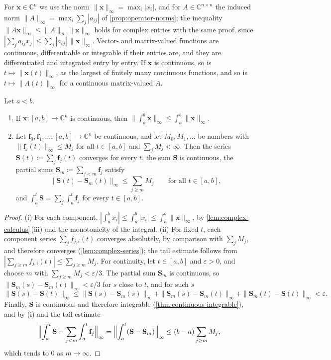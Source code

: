 For $\mathbf x\in\mathbb C^n$ we use the norm $\|\mathbf x\|_\infty=\max_i|x_i|$, and for $A\in\mathbb C^{n\times n}$ the induced norm $\|A\|_\infty=\max_i\sum_j|a_{ij}|$ of \cref{prop:operator-norms}; the inequality $\|A\mathbf x\|_\infty\le\|A\|_\infty\|\mathbf x\|_\infty$ holds for complex entries with the same proof, since $|\sum_ja_{ij}x_j|\le\sum_j|a_{ij}|\,\|\mathbf x\|_\infty$. Vector- and matrix-valued functions are continuous, differentiable or integrable if their entries are, and they are differentiated and integrated entry by entry. If $\mathbf x$ is continuous, so is $t\mapsto\|\mathbf x(t)\|_\infty$, as the largest of finitely many continuous functions, and so is $t\mapsto\|A(t)\|_\infty$ for a continuous matrix-valued $A$.

\begin{lemma}
\label{lem:vector-functions}
Let $a<b$.
\begin{enumerate}
\item If $\mathbf x\colon[a,b]\to\mathbb C^n$ is continuous, then $\bigl\|\int_a^b\mathbf x\bigr\|_\infty\le\int_a^b\|\mathbf x\|_\infty$.
\item Let $\mathbf f_0,\mathbf f_1,\ldots\colon[a,b]\to\mathbb C^n$ be continuous, and let $M_0,M_1,\ldots$ be numbers with $\|\mathbf f_j(t)\|_\infty\le M_j$ for all $t\in[a,b]$ and $\sum_jM_j<\infty$. Then the series $\mathbf S(t)\coloneqq\sum_j\mathbf f_j(t)$ converges for every $t$, the sum $\mathbf S$ is continuous, the partial sums $\mathbf S_m\coloneqq\sum_{j<m}\mathbf f_j$ satisfy
\[
\|\mathbf S(t)-\mathbf S_m(t)\|_\infty\le\sum_{j\ge m}M_j\qquad\text{for all }t\in[a,b],
\]
and $\int_a^t\mathbf S=\sum_j\int_a^t\mathbf f_j$ for every $t\in[a,b]$.
\end{enumerate}
\end{lemma}

\begin{proof}
(i) For each component, $|\int_a^bx_i|\le\int_a^b|x_i|\le\int_a^b\|\mathbf x\|_\infty$, by \cref{lem:complex-calculus}\,(iii) and the monotonicity of the integral. (ii) For fixed $t$, each component series $\sum_jf_{j,i}(t)$ converges absolutely, by comparison with $\sum_jM_j$, and therefore converges (\cref{lem:complex-series}); the tail estimate follows from $|\sum_{j\ge m}f_{j,i}(t)|\le\sum_{j\ge m}M_j$. For continuity, let $t\in[a,b]$ and $\varepsilon>0$, and choose $m$ with $\sum_{j\ge m}M_j<\varepsilon/3$. The partial sum $\mathbf S_m$ is continuous, so $\|\mathbf S_m(s)-\mathbf S_m(t)\|_\infty<\varepsilon/3$ for $s$ close to $t$, and for such $s$
\[
\|\mathbf S(s)-\mathbf S(t)\|_\infty\le\|\mathbf S(s)-\mathbf S_m(s)\|_\infty+\|\mathbf S_m(s)-\mathbf S_m(t)\|_\infty+\|\mathbf S_m(t)-\mathbf S(t)\|_\infty<\varepsilon .
\]
Finally, $\mathbf S$ is continuous and therefore integrable (\cref{thm:continuous-integrable}), and by (i) and the tail estimate
\[
\Bigl\|\int_a^t\mathbf S-\sum_{j<m}\int_a^t\mathbf f_j\Bigr\|_\infty=\Bigl\|\int_a^t(\mathbf S-\mathbf S_m)\Bigr\|_\infty\le(b-a)\sum_{j\ge m}M_j ,
\]
which tends to $0$ as $m\to\infty$.
\end{proof}

